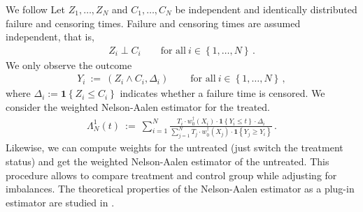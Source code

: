 We follow \cite[Example~3.9.19]{vaart2013}
Let 
$Z_1,\ldots,Z_N$
and
$C_1,\ldots,C_N$ 
be independent and identically distributed failure and censoring  times.
Failure and censoring times are assumed independent, that is, 
\begin{align*}
  Z_i \perp C_i
  \qquad
  \text{for all}\ 
  i\in \left\{ 1,\ldots,N \right\}
  \,.
\end{align*}
We only observe the outcome
\begin{align*}
  Y_i
  \ 
  :=
  \ 
  \left( 
  Z_i
  \land
  C_i
  ,
  \Delta_i
  \right)
  \ 
  \qquad
  \text{for all}\ 
  i\in \left\{ 1,\ldots,N \right\}
  \,,
\end{align*}
where 
$
\Delta_i:=
\mathbf{1}
\left\{ 
  Z_i\le C_i
\right\}
$
indicates whether a failure time is censored. 
We consider the weighted Nelson-Aalen estimator for the treated.
\begin{align*}
  \Lambda^1_N(t)
  \ 
  :=
  \ 
  \sum_{i=1}^{N} \frac{
    T_i\cdot w^\dagger_0(X_i)\cdot\mathbf{1}\left\{ Y_i\le t \right\}
    \cdot \Delta_i
  }{
    \sum_{j=1}^{N} 
    T_j\cdot w^\dagger_0(X_j)\cdot\mathbf{1}\left\{ Y_j\ge Y_i \right\}
  } 
  \,.
\end{align*}
Likewise, we can compute weights for the untreated (just switch the treatment status) and get the weighted Nelson-Aalen estimator of the untreated.
This procedure allows to compare treatment and control group while adjusting for imbalances.
The theoretical properties of the Nelson-Aalen estimator as a plug-in estimator are studied in \cite[Example~3.9.19]{vaart2013}.
